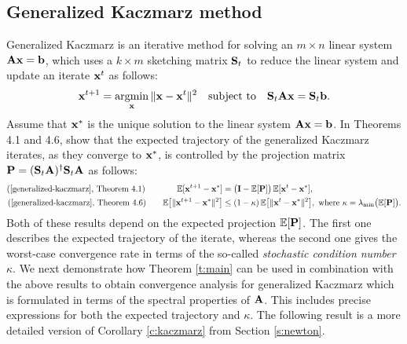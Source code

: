 \documentclass[thesis.tex]{subfiles}
\begin{document}
\subsection{Generalized Kaczmarz method}
Generalized Kaczmarz \cite{generalized-kaczmarz} is an iterative
method for solving an $m\times n$ linear system
$\A\x=\b$, which uses a $k\times m$ sketching matrix $\S_t$ to reduce
the linear system and update an iterate $\x^t$ as follows:
  \begin{align*}
    \x^{t+1} = \argmin_\x\|\x-\x^t\|^2\quad\textnormal{subject to}\quad\S_t\A\x=\S_t\b.
  \end{align*}
Assume that $\x^*$ is the unique solution to the linear system $\A\x=\b$. In Theorems 4.1 and 4.6, \cite{generalized-kaczmarz} show that the
expected trajectory of the generalized Kaczmarz iterates, as
they converge to $\x^*$, is controlled
by the projection matrix $\P=(\S_t\A)^\dagger\S_t\A$ as follows:
\begin{align*}
  \text{(\cite{generalized-kaczmarz}, Theorem 4.1)}\qquad\quad \ \ \,
  \E[\x^{t+1}-\x^*]
  &= \big(\I-\E[\P]\big)\,\E[\x^t-\x^*],\\
  \text{(\cite{generalized-kaczmarz}, Theorem 4.6)}\qquad
  \E\big[\|\x^{t+1}-\x^*\|^2\big]
&\leq (1-\kappa)\,\E\big[\|\x^t-\x^*\|^2\big],
\text{ where }\kappa=\lambda_{\min}\big(\E[\P]\big).
\end{align*}
Both of these results depend on the expected projection
$\E[\P]$. The first one describes the expected trajectory of the
iterate, whereas the second one gives the worst-case convergence
rate in terms of the so-called \emph{stochastic condition number}
$\kappa$. We next demonstrate how Theorem \ref{t:main} can be used  in 
combination with the above results to
obtain convergence analysis for generalized Kaczmarz which is
formulated in terms of the spectral properties of $\A$. This includes
precise expressions for both the expected trajectory and $\kappa$. The following
result is a more detailed version of Corollary \ref{c:kaczmarz} from
Section \ref{s:newton}.
\end{document}
